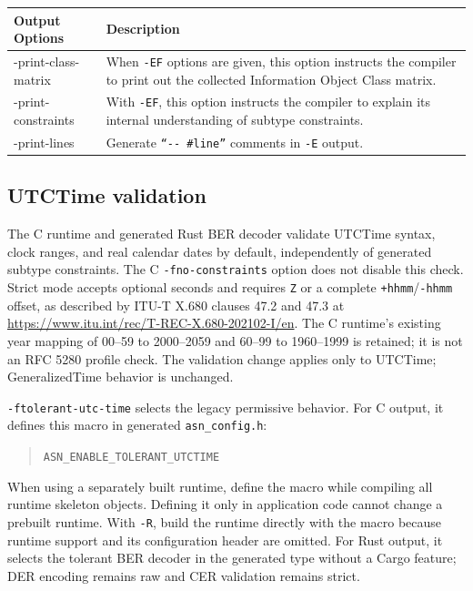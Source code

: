 \documentclass[english,oneside,12pt]{book}
\begin{document}
\begin{longtable}{lp{4in}}
\textbf{Output Options} & \textbf{Description}\\
\midrule
{\ttfamily -print-class-matrix} & {\small When \texttt{-EF} options are given, this option instructs the compiler to print out the collected Information Object Class matrix.}\\
{\ttfamily -print-constraints} & {\small With \texttt{-EF}, this option instructs the compiler
to explain its internal understanding of subtype constraints.}\\
{\ttfamily -print-lines} & {\small Generate \texttt{``-{}- \#line''} comments
in \texttt{-E} output.}\\
\end{longtable}
\renewcommand{\arraystretch}{1}

\clearpage
\subsection{UTCTime validation}\label{sec:utc-time-validation}

The C runtime and generated Rust BER decoder validate UTCTime syntax, clock
ranges, and real calendar dates by default, independently of generated subtype constraints.
The C \texttt{-fno-constraints} option does not disable this check. Strict mode
accepts optional seconds and requires \texttt{Z} or a complete
\texttt{+hhmm}/\texttt{-hhmm} offset, as described by ITU-T X.680 clauses
47.2 and 47.3 at \url{https://www.itu.int/rec/T-REC-X.680-202102-I/en}.
The C runtime's existing year mapping of 00--59 to 2000--2059 and 60--99 to
1960--1999 is retained; it is not an RFC 5280 profile check. The validation
change applies only to UTCTime; GeneralizedTime behavior is unchanged.

\texttt{-ftolerant-utc-time} selects the legacy permissive behavior. For C
output, it defines this macro in generated \texttt{asn\_config.h}:
\begin{quote}
\texttt{ASN\_\allowbreak{}ENABLE\_\allowbreak{}TOLERANT\_\allowbreak{}UTCTIME}
\end{quote}
When using a separately built runtime, define the macro while compiling all
runtime skeleton objects. Defining it only in application code cannot change
a prebuilt runtime. With \texttt{-R}, build the runtime directly with the
macro because runtime support and its configuration header are omitted. For
Rust output, it selects the tolerant BER decoder in the generated type without
a Cargo feature; DER encoding remains raw and CER validation remains strict.
\end{document}
